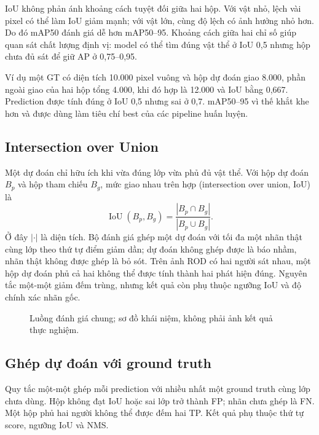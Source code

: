 \documentclass[12pt,a4paper,oneside]{report}
\begin{document}
IoU không phản ánh khoảng cách tuyệt đối giữa hai hộp. Với vật nhỏ, lệch vài pixel có thể làm IoU giảm mạnh; với vật lớn, cùng độ lệch có ảnh hưởng nhỏ hơn. Do đó mAP50 đánh giá dễ hơn mAP50--95. Khoảng cách giữa hai chỉ số giúp quan sát chất lượng định vị: model có thể tìm đúng vật thể ở IoU 0,5 nhưng hộp chưa đủ sát để giữ AP ở 0,75--0,95.

Ví dụ một GT có diện tích 10.000 pixel vuông và hộp dự đoán giao 8.000, phần ngoài giao của hai hộp tổng 4.000, khi đó hợp là 12.000 và IoU bằng 0,667. Prediction được tính đúng ở IoU 0,5 nhưng sai ở 0,7. mAP50--95 vì thế khắt khe hơn và được dùng làm tiêu chí best của các pipeline huấn luyện.
\subsection{Intersection over Union}
Một dự đoán chỉ hữu ích khi vừa đúng lớp vừa phủ đủ vật thể. Với hộp dự đoán $B_p$ và hộp tham chiếu $B_g$, mức giao nhau trên hợp (intersection over union, IoU) là
\begin{equation}\operatorname{IoU}(B_p,B_g)=\frac{|B_p\cap B_g|}{|B_p\cup B_g|}.\end{equation}
Ở đây $|\cdot|$ là diện tích. Bộ đánh giá ghép một dự đoán với tối đa một nhãn thật cùng lớp theo thứ tự điểm giảm dần; dự đoán không ghép được là báo nhầm, nhãn thật không được ghép là bỏ sót.  Trên ảnh ROD có hai người sát nhau, một hộp dự đoán phủ cả hai không thể được tính thành hai phát hiện đúng. Nguyên tắc một-một giảm đếm trùng, nhưng kết quả còn phụ thuộc ngưỡng IoU và độ chính xác nhãn gốc.

\begin{figure}[htbp]\centering
{}
\caption{Luồng đánh giá chung; sơ đồ khái niệm, không phải ảnh kết quả thực nghiệm.}\end{figure}
\subsection{Ghép dự đoán với ground truth}
Quy tắc một-một ghép mỗi prediction với nhiều nhất một ground truth cùng lớp chưa dùng. Hộp không đạt IoU hoặc sai lớp trở thành FP; nhãn chưa ghép là FN. Một hộp phủ hai người không thể được đếm hai TP. Kết quả phụ thuộc thứ tự score, ngưỡng IoU và NMS.
\end{document}
